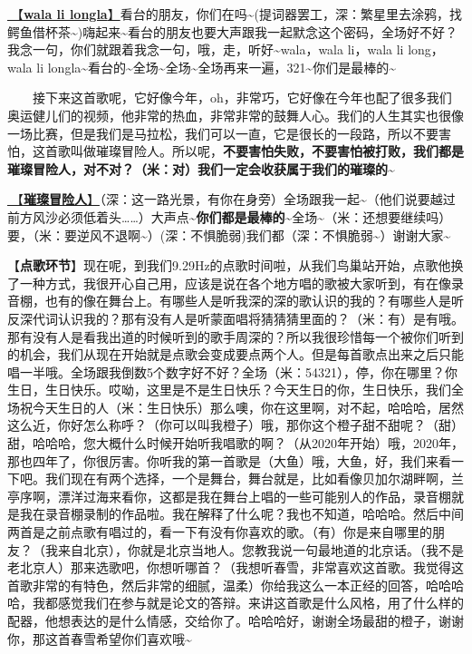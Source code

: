 \documentclass[]{ctexbook}
\begin{document}
\hyperref[wala-li-longla]{🎵【\textbf{wala li longla}】}看台的朋友，你们在吗\textasciitilde(提词器罢工，深：繁星里去涂鸦，找鳄鱼借杯茶\textasciitilde)嗨起来\textasciitilde 看台的朋友也要大声跟我一起默念这个密码，全场好不好？我念一句，你们就跟着我念一句，哦，走，听好\textasciitilde wala，wala li，wala li long，wala li longla\textasciitilde 看台的\textasciitilde 全场\textasciitilde 全场\textasciitilde 全场再来一遍，321\textasciitilde 你们是最棒的\textasciitilde{}

  接下来这首歌呢，它好像今年，oh，非常巧，它好像在今年也配了很多我们奥运健儿们的视频，他非常的热血，非常非常的鼓舞人心。我们的人生其实也很像一场比赛，但是我们是马拉松，我们可以一直，它是很长的一段路，所以不要害怕，这首歌叫做璀璨冒险人。所以呢，\textbf{不要害怕失败，不要害怕被打败，我们都是璀璨冒险人，对不对？（米：对）我们一定会收获属于我们的璀璨的\textasciitilde{}}

\hyperref[adventurers]{🎵【\textbf{璀璨冒险人}】}（深：这一路光景，有你在身旁）全场跟我一起\textasciitilde（他们说要越过前方风沙必须低着头\ldots\ldots）大声点\textasciitilde{}\textbf{你们都是最棒的\textasciitilde{}}全场\textasciitilde（米：还想要继续吗）要，（米：要逆风不退啊\textasciitilde）(深：不惧脆弱)我们都（深：不惧脆弱\textasciitilde）谢谢大家\textasciitilde{}

【\textbf{点歌环节}】现在呢，到我们9.29Hz的点歌时间啦，从我们鸟巢站开始，点歌他换了一种方式，我很开心自己用，应该是说在各个地方唱的歌被大家听到，有在像录音棚，也有的像在舞台上。有哪些人是听我深的深的歌认识的我的？有哪些人是听反深代词认识我的？那有没有人是听蒙面唱将猜猜猜里面的？（米：有）是有哦。那有没有人是看我出道的时候听到的歌手周深的？所以我很珍惜每一个被你们听到的机会，我们从现在开始就是点歌会变成要点两个人。但是每首歌点出来之后只能唱一半哦。全场跟我倒数5个数字好不好？全场（米：54321），停，你在哪里？你生日，生日快乐。哎呦，这里是不是生日快乐？今天生日的你，生日快乐，我们全场祝今天生日的人（米：生日快乐）那么噢，你在这里啊，对不起，哈哈哈，居然这么近，你好怎么称呼？（你可以叫我橙子）哦，那你这个橙子甜不甜呢？（甜）甜，哈哈哈，您大概什么时候开始听我唱歌的啊？（从2020年开始）哦，2020年，那也四年了，你很厉害。你听我的第一首歌是（大鱼）哦，大鱼，好，我们来看一下吧。我们现在有两个选择，一个是舞台，舞台就是，比如看像贝加尔湖畔啊，兰亭序啊，漂洋过海来看你，这都是我在舞台上唱的一些可能别人的作品，录音棚就是我在录音棚录制的作品啦。我在解释了什么呢？我也不知道，哈哈哈。然后中间两首是之前点歌有唱过的，看一下有没有你喜欢的歌。（有）你是来自哪里的朋友？（我来自北京），你就是北京当地人。您教我说一句最地道的北京话。（我不是老北京人）那来选歌吧，你想听哪首？（我想听春雪，非常喜欢这首歌。我觉得这首歌非常的有特色，然后非常的细腻，温柔）你给我这么一本正经的回答，哈哈哈哈，我都感觉我们在参与就是论文的答辩。来讲这首歌是什么风格，用了什么样的配器，他想表达的是什么情感，交给你了。哈哈哈好，谢谢全场最甜的橙子，谢谢你，那这首春雪希望你们喜欢哦\textasciitilde{}
\end{document}
